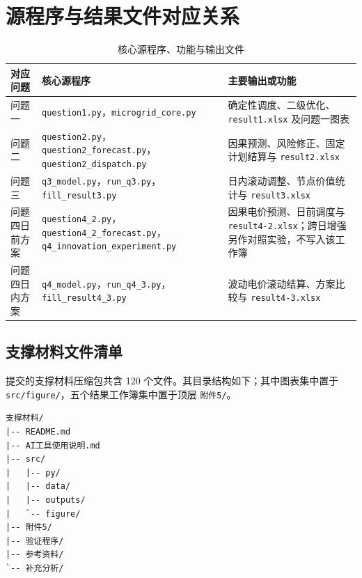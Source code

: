 \documentclass[withoutpreface,bwprint]{cumcmthesis}
\begin{document}
\section{源程序与结果文件对应关系}

\begin{table}[H]
  \centering
  \caption{核心源程序、功能与输出文件}
  \small
  \begin{tabularx}{\textwidth}{p{1.7cm}>{\raggedright\arraybackslash}p{5.4cm}>{\raggedright\arraybackslash}X}
    \toprule
    对应问题 & 核心源程序 & 主要输出或功能 \\
    \midrule
    问题一 & \texttt{question1.py}，\texttt{microgrid\_core.py}
      & 确定性调度、二级优化、\texttt{result1.xlsx} 及问题一图表 \\
    问题二 & \texttt{question2.py}，\texttt{question2\_forecast.py}，
      \texttt{question2\_dispatch.py}
      & 因果预测、风险修正、固定计划结算与 \texttt{result2.xlsx} \\
    问题三 & \texttt{q3\_model.py}，\texttt{run\_q3.py}，\texttt{fill\_result3.py}
      & 日内滚动调整、节点价值统计与 \texttt{result3.xlsx} \\
    问题四日前方案 & \texttt{question4\_2.py}，\texttt{question4\_2\_forecast.py}，
      \texttt{q4\_innovation\_experiment.py}
      & 因果电价预测、日前调度与 \texttt{result4-2.xlsx}；跨日增强另作对照实验，不写入该工作簿 \\
    问题四日内方案 & \texttt{q4\_model.py}，\texttt{run\_q4\_3.py}，
      \texttt{fill\_result4\_3.py}
      & 波动电价滚动结算、方案比较与 \texttt{result4-3.xlsx} \\
    \bottomrule
  \end{tabularx}
\end{table}

\clearpage
\subsection*{支撑材料文件清单}

提交的支撑材料压缩包共含 120 个文件。其目录结构如下；其中图表集中置于
\texttt{src/figure/}，五个结果工作簿集中置于顶层 \texttt{附件5/}。

\begin{verbatim}
支撑材料/
|-- README.md
|-- AI工具使用说明.md
|-- src/
|   |-- py/
|   |-- data/
|   |-- outputs/
|   `-- figure/
|-- 附件5/
|-- 验证程序/
|-- 参考资料/
`-- 补充分析/
\end{verbatim}
\end{document}
